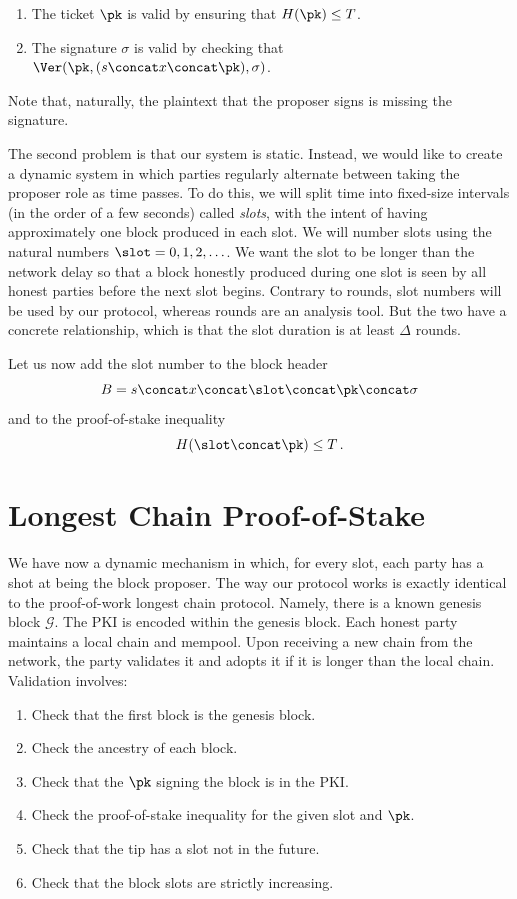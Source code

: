 \begin{enumerate}
  \item The ticket $\pk$ is valid by ensuring that $H(\pk) \leq T$.
  \item The signature $\sigma$ is valid by checking that $\Ver(\pk, (s \concat x \concat \pk), \sigma)$.
\end{enumerate}

Note that, naturally, the plaintext that the proposer signs is missing the signature.

The second problem is that our system is static. Instead,
we would like to create a dynamic system in which parties regularly alternate
between taking the proposer role as time passes. To do this, we will split time
into fixed-size intervals (in the order of a few seconds)
called \emph{slots},
with the intent of
having approximately one block produced in each slot. We will number slots using
the natural numbers $\slot = 0, 1, 2, \ldots$. We want the slot to be longer than the
network delay so that a block honestly produced during one slot is seen by
all honest parties before the next slot begins. Contrary to rounds,
slot numbers will be used by our protocol, whereas rounds are an analysis
tool. But the two have a concrete relationship, which is that the slot duration
is at least $\Delta$ rounds.

Let us now add the slot number to the block header
\[
B = s \concat x \concat \slot \concat \pk \concat \sigma
\]
and to the proof-of-stake inequality
\[
H(\slot \concat \pk) \leq T\,.
\]

\section{Longest Chain Proof-of-Stake}

We have now a dynamic mechanism in which, for every slot, each party has a shot at being
the block proposer. The way our protocol works is exactly identical to the proof-of-work longest
chain protocol. Namely, there is a known genesis block $\mathcal{G}$.
The PKI is encoded within the genesis block.
Each honest party maintains a local chain and mempool. Upon receiving
a new chain from the network, the party validates it and adopts it if it is longer than the local chain.
Validation involves:

\begin{enumerate}
  \item Check that the first block is the genesis block.
  \item Check the ancestry of each block.
  \item Check that the $\pk$ signing the block is in the PKI.
  \item Check the proof-of-stake inequality for the given slot and $\pk$.
  \item Check that the tip has a slot not in the future.
  \item Check that the block slots are strictly increasing.
\end{enumerate}

